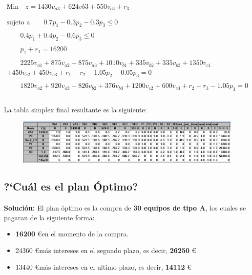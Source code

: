 \documentclass[10pt, a4paper]{article}
\begin{document}
			\[
			\begin{split}
				\text{Min} \quad z =1430v_{a3} + 624v{b3} + 550v_{c3} + r_{3}  \\
									\\ \\
				\text{sujeto a}
				\qquad 	0.7p_{1} - 0.3p_{2} - 0.3p_{3} \leq 0  \\ \\
				\qquad 	0.4p_{1} + 0.4p_{2} - 0.6p_{3} \leq 0  \\ \\
				\qquad 	p_{1} + r_{1} = 16200  \\ \\
				\qquad 	2225v_{a1} + 875v_{a2} + 875v_{a3} + 1010v_{b1} + 335v_{b2} + 335v_{b3} + 1350v_{c1} \\
				+ 450v_{c2} + 450v_{c3} + r_{1} - r_{2} - 1.05p_{2} - 0.05p_{3}  = 0  \\ \\
				\qquad 	1820v_{a2} + 920v_{a3} + 826v_{b2} + 376v_{b3} + 1200v_{c2} + 600v_{c3} + r_{2} - r_{3} - 1.05p_{3} = 0   \\
			\end{split}
			\]

			\paragraph{}
			La tabla simplex final resultante es la siguiente:

			\begin{figure}[H]
			\centering
				\includegraphics[width=\textwidth]{res/Exercise_2_pp_simplex_final.png}
			\end{figure}

		\subsection{?`Cuál es el plan Óptimo?}

			\paragraph{}
			\textbf{Solución:} El plan óptimo es la compra de \textbf{30 equipos de tipo A}, los cuales se pagaran de la siguiente forma:
			\begin{itemize}
				\item \textbf{16200} \euro en el momento de la compra.
				\item 24360 \euro más intereses en el segundo plazo, es decir, \textbf{26250} \euro
				\item 13440 \euro más intereses en el ultimo plazo, es decir, \textbf{14112} \euro
			\end{itemize}
\end{document}
